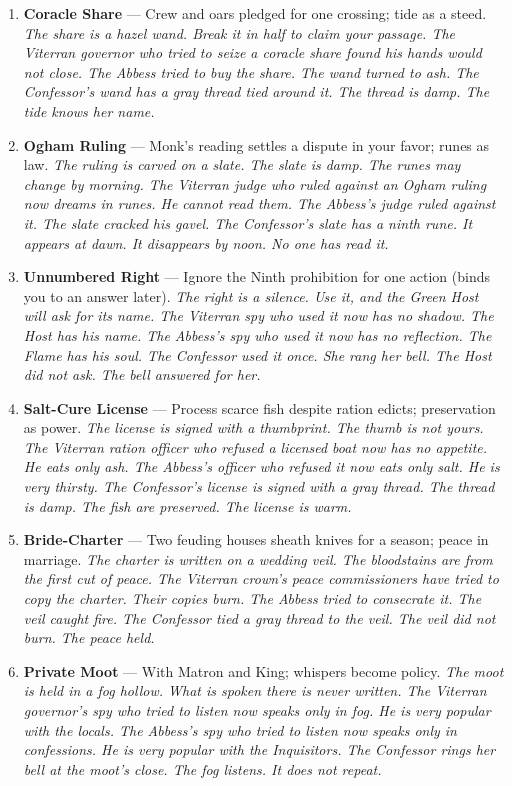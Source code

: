 \begin{enumerate}
\item \textbf{Coracle Share} --- Crew and oars pledged for one crossing; tide as a steed.
  \hfill \textit{The share is a hazel wand. Break it in half to claim your passage. The Viterran governor who tried to seize a coracle share found his hands would not close. The Abbess tried to buy the share. The wand turned to ash. The Confessor's wand has a gray thread tied around it. The thread is damp. The tide knows her name.}
\item \textbf{Ogham Ruling} --- Monk's reading settles a dispute in your favor; runes as law.
  \hfill \textit{The ruling is carved on a slate. The slate is damp. The runes may change by morning. The Viterran judge who ruled against an Ogham ruling now dreams in runes. He cannot read them. The Abbess's judge ruled against it. The slate cracked his gavel. The Confessor's slate has a ninth rune. It appears at dawn. It disappears by noon. No one has read it.}
\item \textbf{Unnumbered Right} --- Ignore the Ninth prohibition for one action (binds you to an answer later).
  \hfill \textit{The right is a silence. Use it, and the Green Host will ask for its name. The Viterran spy who used it now has no shadow. The Host has his name. The Abbess's spy who used it now has no reflection. The Flame has his soul. The Confessor used it once. She rang her bell. The Host did not ask. The bell answered for her.}
\item \textbf{Salt-Cure License} --- Process scarce fish despite ration edicts; preservation as power.
  \hfill \textit{The license is signed with a thumbprint. The thumb is not yours. The Viterran ration officer who refused a licensed boat now has no appetite. He eats only ash. The Abbess's officer who refused it now eats only salt. He is very thirsty. The Confessor's license is signed with a gray thread. The thread is damp. The fish are preserved. The license is warm.}
\item[J] \textbf{Bride-Charter} --- Two feuding houses sheath knives for a season; peace in marriage.
  \hfill \textit{The charter is written on a wedding veil. The bloodstains are from the first cut of peace. The Viterran crown's peace commissioners have tried to copy the charter. Their copies burn. The Abbess tried to consecrate it. The veil caught fire. The Confessor tied a gray thread to the veil. The veil did not burn. The peace held.}
\item[Q] \textbf{Private Moot} --- With Matron and King; whispers become policy.
  \hfill \textit{The moot is held in a fog hollow. What is spoken there is never written. The Viterran governor's spy who tried to listen now speaks only in fog. He is very popular with the locals. The Abbess's spy who tried to listen now speaks only in confessions. He is very popular with the Inquisitors. The Confessor rings her bell at the moot's close. The fog listens. It does not repeat.}

\end{enumerate}
